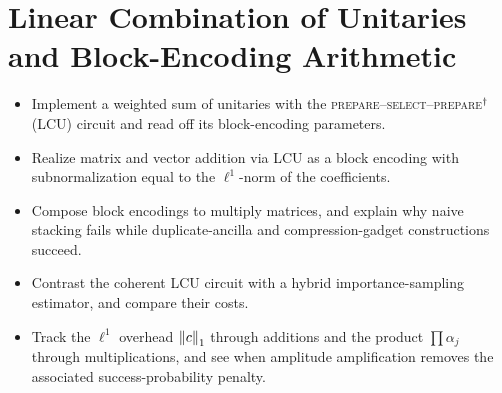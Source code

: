 \chapter{Linear Combination of Unitaries and Block-Encoding Arithmetic}
\label{ch:lec07}

\begin{objectives}
\begin{itemize}[leftmargin=1.4em,nosep]
  \item Implement a weighted sum of unitaries with the \textsc{prepare}--\textsc{select}--\textsc{prepare}$^{\dagger}$ (LCU) circuit and read off its block-encoding parameters.
  \item Realize matrix and vector addition via LCU as a block encoding with subnormalization equal to the $\ell^1$-norm of the coefficients.
  \item Compose block encodings to multiply matrices, and explain why naive stacking fails while duplicate-ancilla and compression-gadget constructions succeed.
  \item Contrast the coherent LCU circuit with a hybrid importance-sampling estimator, and compare their costs.
  \item Track the $\ell^1$ overhead $\left\lVert c \right\rVert_1$ through additions and the product $\prod\alpha_j$ through multiplications, and see when amplitude amplification removes the associated success-probability penalty.
\end{itemize}
\end{objectives}

